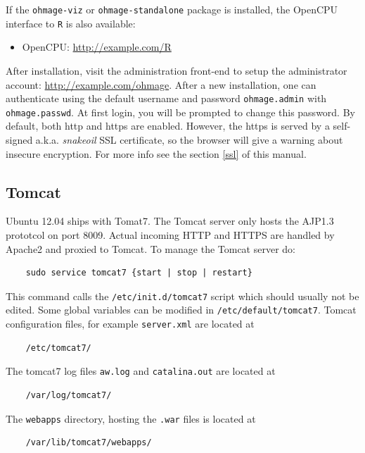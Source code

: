 \documentclass{scrartcl}
\begin{document}
If the \texttt{ohmage-viz} or \texttt{ohmage-standalone} package is installed,
the OpenCPU interface to \texttt{R} is also available:

\begin{itemize}
  \item OpenCPU: \url{http://example.com/R} 
\end{itemize}

After installation, visit the administration front-end to setup the
administrator account: \url{http://example.com/ohmage}. After a new
installation, one can authenticate using the default username and password
\texttt{ohmage.admin} with \texttt{ohmage.passwd}. At first login, you will
be prompted to change this password. By default, both http and https are
enabled. However, the https is served by a self-signed a.k.a. \emph{snakeoil}
SSL certificate, so the browser will give a warning about insecure encryption.
For more info see the section \ref{ssl} of this manual.

\subsection{Tomcat}

Ubuntu 12.04 ships with Tomat7. The Tomcat server only hosts the AJP1.3
prototcol on port 8009. Actual incoming HTTP and HTTPS are handled by Apache2
and proxied to Tomcat. To manage the Tomcat server do:

\begin{verbatim}
    sudo service tomcat7 {start | stop | restart}
\end{verbatim}
This command calls the \texttt{/etc/init.d/tomcat7} script which should usually
not be edited. Some global variables can be modified in
\texttt{/etc/default/tomcat7}. Tomcat configuration files, for example
\texttt{server.xml} are located at

\begin{verbatim}
    /etc/tomcat7/
\end{verbatim}
The tomcat7 log files \texttt{aw.log} and \texttt{catalina.out} are located
at

\begin{verbatim}
    /var/log/tomcat7/
\end{verbatim}
The \texttt{webapps} directory, hosting the \texttt{.war} files is located at

\begin{verbatim}
    /var/lib/tomcat7/webapps/
\end{verbatim}
\end{document}
